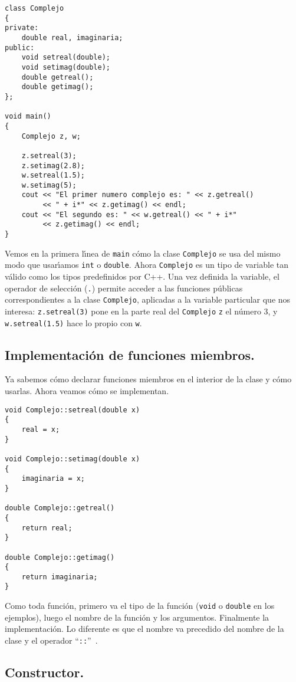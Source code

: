 \begin{verbatim}
class Complejo
{
private:
    double real, imaginaria;
public:
    void setreal(double);
    void setimag(double);
    double getreal();
    double getimag();
};

void main()
{
    Complejo z, w;
    
    z.setreal(3);
    z.setimag(2.8);
    w.setreal(1.5);
    w.setimag(5);
    cout << "El primer numero complejo es: " << z.getreal() 
         << " + i*" << z.getimag() << endl;
    cout << "El segundo es: " << w.getreal() << " + i*" 
         << z.getimag() << endl;
}
\end{verbatim}
Vemos en la primera l\'{\i}nea de \verb+main+ c{\'o}mo la clase
\verb+Complejo+ se usa del mismo modo que usar\'{\i}amos \verb+int+ o
\verb+double+. Ahora \verb+Complejo+ es un tipo de variable tan
v{\'a}lido como los tipos predefinidos por C++. Una vez definida la
variable, el operador de selecci{\'o}n (\verb+.+) permite acceder a las
funciones p{\'u}blicas correspondientes a la clase \verb+Complejo+,
aplicadas a la variable particular que nos interesa:
\verb+z.setreal(3)+ pone en la parte real del \verb+Complejo+
\verb+z+ el n{\'u}mero 3, y \verb+w.setreal(1.5)+ hace lo propio con
\verb+w+. 

\subsection{Implementaci{\'o}n de funciones miembros.}

Ya sabemos c{\'o}mo declarar funciones miembros en el interior de la
clase y c{\'o}mo usarlas. Ahora veamos c{\'o}mo se implementan. 
\begin{verbatim}
void Complejo::setreal(double x)
{
    real = x;
}

void Complejo::setimag(double x)
{
    imaginaria = x;
}

double Complejo::getreal()
{
    return real;
}

double Complejo::getimag()
{
    return imaginaria;
}
\end{verbatim}
Como toda funci{\'o}n, primero va el tipo de la funci{\'o}n (\verb+void+
o \verb+double+ en los ejemplos), luego el nombre de la funci{\'o}n y
los argumentos. Finalmente la implementaci{\'o}n. Lo diferente es que
el nombre va precedido del nombre de la clase y el operador
``\verb+::+''\ .


\subsection{Constructor.}

